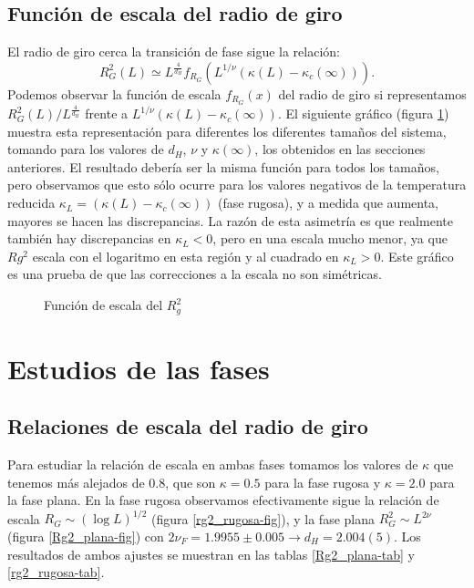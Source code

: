 \subsection{Función de escala del radio de giro}
El radio de giro cerca la transición de fase sigue la relación:
\begin{equation}
    R^2_G(L)\simeq L^{\frac{4}{d_H}}f_{R_G}\left(L^{1/\nu}(\kappa(L)-\kappa_c(\infty))\right).
\end{equation}
Podemos observar la función de escala $f_{R_G}(x)$ del radio de giro si
representamos $R^2_G(L)/ L^{\frac{4}{d_H}}$ frente a
$L^{1/\nu}(\kappa(L)-\kappa_c(\infty))$. El siguiente gráfico (figura
\ref{funcion_escala_rg2-fig}) muestra esta representación para diferentes los
diferentes tamaños del sistema, tomando para los valores de $d_H$, $\nu$ y
$\kappa(\infty)$, los obtenidos en las secciones anteriores. El resultado
debería ser la misma función para todos los tamaños, pero observamos que esto
sólo ocurre para los valores negativos de la temperatura reducida
$\kappa_L=(\kappa(L)-\kappa_c(\infty))$ (fase rugosa), y a medida que aumenta,
mayores se hacen las discrepancias. La razón de esta asimetría es que
realmente también hay discrepancias en $\kappa_L<0$, pero en una escala mucho
menor, ya que $Rg^2$ escala con el logaritmo en esta región y al cuadrado en
$\kappa_L>0$. Este gráfico es una prueba de que las correcciones a la escala
no son simétricas. 
\begin{figure}[h]
  \centering
  
  \caption{Función de escala del $R^2_g$}\label{funcion_escala_rg2-fig}
\end{figure}

\clearpage


\section{Estudios de las fases}

\subsection{Relaciones de escala del radio de giro}

Para estudiar la relación de escala en ambas fases tomamos los valores de $\kappa$ que tenemos
más alejados de $0.8$, que son $\kappa=0.5$ para la fase rugosa y $\kappa=2.0$
para la fase plana. En la fase rugosa observamos efectivamente sigue la
relación de escala $R_G\sim (\log L)^{1/2}$ (figura \ref{rg2_rugosa-fig}), y la
fase plana $R_G^2\sim L^{2\nu}$ (figura \ref{Rg2_plana-fig}) con $2\nu_F=1.9955 \pm
0.005\rightarrow d_H=2.004(5)$. Los resultados de ambos ajustes se muestran en
las tablas \ref{Rg2_plana-tab} y \ref{rg2_rugosa-tab}.

